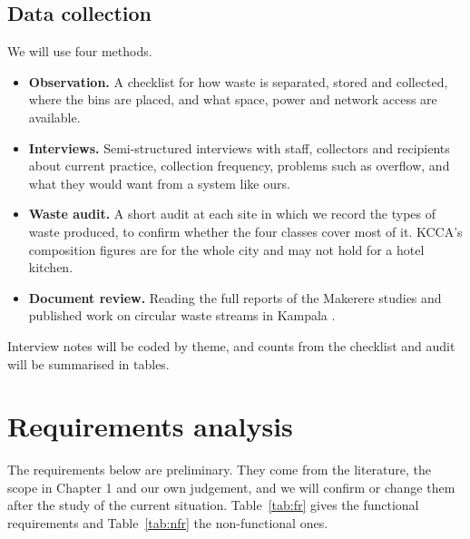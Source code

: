 \documentclass[12pt,a4paper]{report}
\begin{document}
\subsection{Data collection}

We will use four methods.

\begin{itemize}[leftmargin=*,itemsep=0.3em]
\item \textbf{Observation.} A checklist for how waste is separated, stored and collected, where the bins are placed, and what space, power and network access are available.
\item \textbf{Interviews.} Semi-structured interviews with staff, collectors and recipients about current practice, collection frequency, problems such as overflow, and what they would want from a system like ours.
\item \textbf{Waste audit.} A short audit at each site in which we record the types of waste produced, to confirm whether the four classes cover most of it. KCCA's composition figures are for the whole city \cite{kcca2026} and may not hold for a hotel kitchen.
\item \textbf{Document review.} Reading the full reports of the Makerere studies \cite{musoke,turyahebwa,walina} and published work on circular waste streams in Kampala \cite{ssepuuya}.
\end{itemize}

Interview notes will be coded by theme, and counts from the checklist and audit will be summarised in tables.

\section{Requirements analysis}

The requirements below are preliminary. They come from the literature, the scope in Chapter 1 and our own judgement, and we will confirm or change them after the study of the current situation. Table~\ref{tab:fr} gives the functional requirements and Table~\ref{tab:nfr} the non-functional ones.
\end{document}
